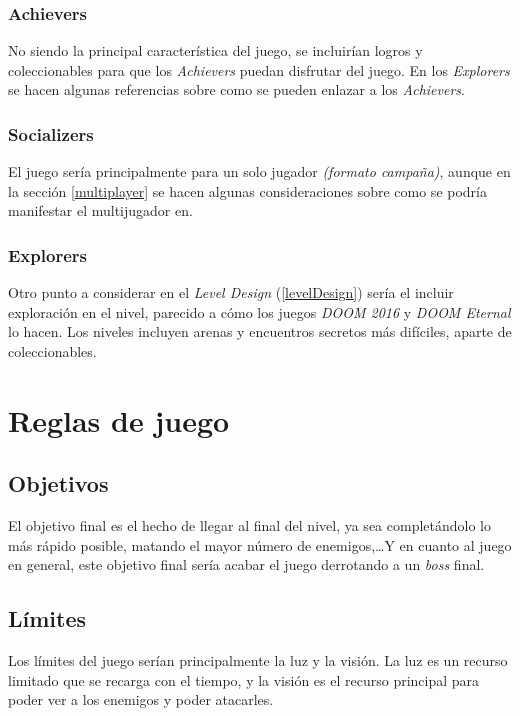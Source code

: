        \subsubsection{Achievers}
            No siendo la principal característica del juego, se incluirían logros y coleccionables para que los \textit{Achievers} puedan disfrutar del juego. En los \textit{Explorers} se hacen algunas referencias sobre como se pueden enlazar a los \textit{Achievers}.
        \subsubsection{Socializers}
            El juego sería principalmente para un solo jugador \textit{(formato campaña)}, aunque en la sección \ref{multiplayer} se hacen algunas consideraciones sobre como se podría manifestar el multijugador en\TWD.
        \subsubsection{Explorers}
            Otro punto a considerar en el \textit{Level Design} (\ref{levelDesign}) sería el incluir exploración en el nivel, parecido a cómo los juegos \textit{DOOM 2016} y \textit{DOOM Eternal} lo hacen. Los niveles incluyen arenas y encuentros secretos más difíciles, aparte de coleccionables.

\section{Reglas de juego}

    \subsection{Objetivos}
        El objetivo final es el hecho de llegar al final del nivel, ya sea completándolo lo más rápido posible, matando el mayor número de enemigos,\dots\space Y en cuanto al juego en general, este objetivo final sería acabar el juego derrotando a un \textit{boss} final.
    \subsection{Límites}
        Los límites del juego serían principalmente la luz y la visión. La luz es un recurso limitado que se recarga con el tiempo, y la visión es el recurso principal para poder ver a los enemigos y poder atacarles.

